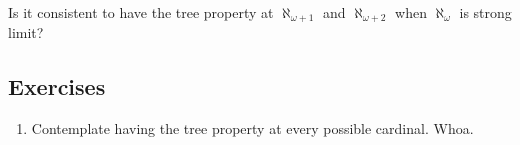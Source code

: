 \documentclass[10pt]{amsart}
\begin{document}
\begin{question}
Is it consistent to have the tree property at $\aleph_{\omega+1}$ and $\aleph_{\omega+2}$ when $\aleph_{\omega}$ is strong limit?
\end{question}

\subsection*{Exercises}

\begin{enumerate}
\item Contemplate having the tree property at every possible cardinal. Whoa.
\end{enumerate}
\end{document}
